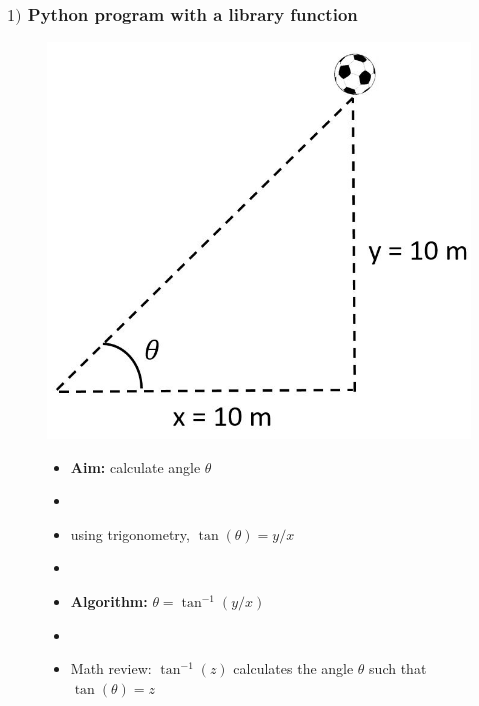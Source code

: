 \documentclass[14pt]{beamer}
\begin{document}
\begin{frame}[fragile]
\frametitle{$1)$ Python program with a library function}

\begin{figure}[ht]
	\centering
	\begin{minipage}{0.4\textwidth}
		\includegraphics[width=\textwidth]{figures/LLp12ball}
	\end{minipage}\hfill
	\begin{minipage}{0.6\textwidth}
		\begin{itemize}
			\item \textbf{Aim:} calculate angle $\theta$
			\item[]
			\item using trigonometry, $\tan(\theta) = y/x$
			\item[]
			\item \textbf{Algorithm:} $\theta = \tan^{-1}(y/x)$
			\item[]
			\item Math review: $\tan^{-1}(z)$ calculates the angle $\theta$ such that $\tan(\theta)=z$
		\end{itemize}
	\end{minipage}
\end{figure}

\end{frame}
\end{document}
